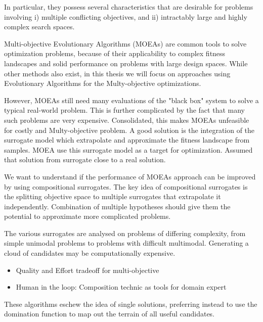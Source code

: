             In particular, they possess several characteristics that are desirable for problems involving i) multiple conflicting objectives, and ii) intractably large and highly complex
            search spaces.
            

            Multi-objective Evolutionary Algorithms (MOEAs) are common tools to solve optimization problems, 
            because of their applicability to complex fitness landscapes and solid performance on problems with large design spaces. 
            While other methods also exist, in this thesis we will focus on approaches using Evolutionary Algorithms for the Multy-objective optimizations.

            However, MOEAs still need many evaluations of the "black box" system to solve a typical real-world problem. 
            This is further complicated by the fact that many such problems are very expensive. Consolidated, this makes MOEAs unfeasible for costly and Multy-objective problem.
            A good solution is the integration of the surrogate model which extrapolate and approximate the fitness landscape from samples. MOEA use this surrogate model 
            as a target for optimization. Assumed that solution from surrogate close to a real solution.
            
            We want to understand if the performance of MOEAs approach can be improved by using compositional surrogates. 
            The key idea of compositional surrogates is the splitting objective space to multiple surrogates that extrapolate it independently. 
            Combination of multiple hypotheses should give them the potential to approximate more complicated problems. 

            The various surrogates are analysed on problems of differing complexity, from simple unimodal problems to problems with difficult multimodal. 
            Generating a cloud of candidates may be computationally expensive.

            \begin{itemize}
                \item Quality and Effort tradeoff for multi-objective
                \item Human in the loop: Composition technic as tools for domain expert
            \end{itemize}

            These algorithms eschew the idea of single solutions, preferring instead to use the domination function to map out the terrain of all useful candidates.



